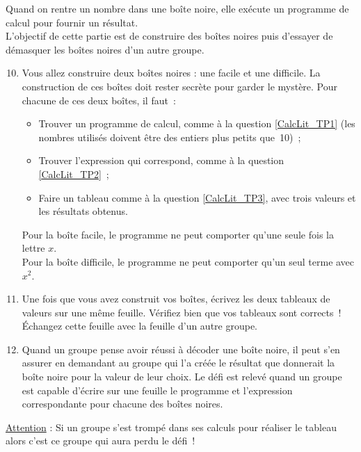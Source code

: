 \begin{TP}
Quand on rentre un nombre dans une boîte noire, elle exécute un programme de calcul pour fournir un résultat. \\[0.5em]
L'objectif de cette partie est de construire des boîtes noires puis d'essayer de démasquer les boîtes noires d'un autre groupe. \\[0.5em]
\begin{enumerate}
\setcounter{enumi}{9}
 \item Vous allez construire deux boîtes noires : une facile et une difficile. La construction de ces boîtes doit rester secrète pour garder le mystère. Pour chacune de ces deux boîtes, il faut :
 \vspace{0.3cm}
 \begin{itemize}
  \item Trouver un programme de calcul, comme à la question \ref{CalcLit_TP1} (les nombres utilisés doivent être des entiers plus petits que 10) ;
  \item Trouver l'expression qui correspond, comme à la question \ref{CalcLit_TP2} ; 
  \item Faire un tableau comme à la question \ref{CalcLit_TP3}, avec trois valeurs et les résultats obtenus.
  \end{itemize}
 \vspace{0.3cm}
Pour la boîte facile, le programme ne peut comporter qu'une seule fois la lettre $x$. \\[0.5em]
Pour la boîte difficile, le programme ne peut comporter qu'un seul terme avec  $x^2$.
 \vspace{0.3cm}
 \item Une fois que vous avez construit vos boîtes, écrivez les deux tableaux de valeurs sur une même feuille. Vérifiez bien que vos tableaux sont corrects ! Échangez cette feuille avec la feuille d'un autre groupe.
 \item Quand un groupe pense avoir réussi à décoder une boîte noire, il peut s'en assurer en demandant au groupe qui l'a créée le résultat que donnerait la boîte noire pour la valeur de leur choix. Le défi est relevé quand un groupe est capable d'écrire sur une feuille le programme et l'expression correspondante pour chacune des boîtes noires.
 \end{enumerate}
\underline{Attention} : Si un groupe s'est trompé dans ses calculs pour réaliser le tableau alors c'est ce groupe qui aura perdu le défi !

\end{TP}

